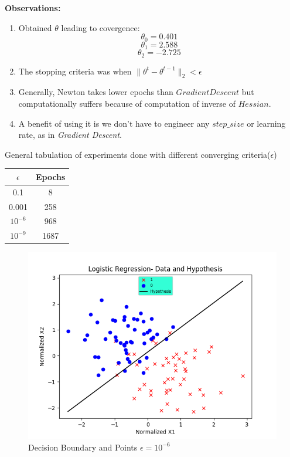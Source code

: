 \documentclass{article}
\newcommand{\bld}[1]{\textbf{#1}}
\newcommand{\ital}[1]{\textit{#1}}
\begin{document}
\bld{Observations:}
\begin{enumerate}
	\item Obtained $\theta$ leading to covergence: $$\theta_0=0.401$$ $$\theta_1=2.588$$ $$\theta_2=-2.725$$
	\item The stopping criteria was when $\|\theta^t-\theta^{t-1}\|_2<\epsilon$
	\item Generally, Newton takes lower epochs than $Gradient Descent$ but computationally suffers because of computation of inverse of $Hessian$.
	\item A benefit of using it is we don't have to engineer any $step\_size$ or learning rate, as in \ital{Gradient Descent}.
\end{enumerate}
General tabulation of experiments done with different converging criteria($\epsilon$)
\begin{center}
 \begin{tabular}{||c|c||} 
 \hline
 $\epsilon$ & Epochs \\ [0.5ex] 
 \hline\hline
 0.1 & 8  \\ 
 \hline
 0.001 & 258 \\
 \hline
 $10^{-6}$ & 968 \\
 \hline
 $10^{-9}$ & 1687 \\
 \hline
\end{tabular}
\end{center}

\begin{figure}[h]
\vspace*{-0.5cm}
\centering
\includegraphics[scale=0.75]{Logistic.png}
\caption{Decision Boundary and Points $\epsilon=10^{-6}$}
\end{figure}
\end{document}
